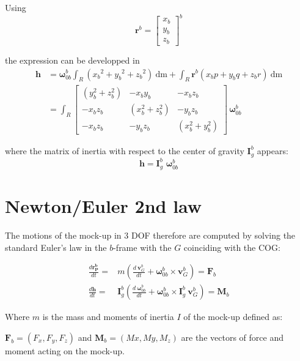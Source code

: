 \documentclass{article}
\begin{document}
Using 
\begin{equation}
	\textbf{r}^b=
  \begin{bmatrix}
	x_{b} \\
	y_{b} \\
	z_{b}
	\end{bmatrix}^b
\end{equation}

the expression can be developped in
\begin{align} \label{angularmomentumtoInertia}
\textbf{h} & =    \mathbf{\omega}_{0b}^b \int_{R} ({x_{b}}^2 + {y_{b}}^2 + {z_{b}}^2 ) \: \text{dm}  + \int_{R} \textbf{r}^b ({x_{b}} p + {y_{b}} q + {z_{b}} r)  \: \text{dm} \\
& = \int_{R}
\begin{bmatrix}
(y_b^2 + z_b^2)  &  - x_b y_b & - x_b z_b \\
 - x_b z_b & (x_b^2 + z_b^2) & -y_b z_b\\
 - x_b z_b &  -y_b z_b & (x_b^2 +y_b^2)
\end{bmatrix}\,  \mathbf{\omega}_{0b}^b
\end{align}

where the matrix of inertia with respect to the center of gravity $\textbf{I}^b_g$ appears:
\begin{equation}
 \textbf{h}=   \textbf{I}^b_g \, \,  \mathbf{\omega}_{0b}^b
\end{equation}


\section{Newton/Euler 2nd law}

The motions of the mock-up in 3 DOF therefore are computed by solving the standard Euler's law in the $b$-frame with the $G$ coinciding with the COG:  

\begin{align}
	\frac{d \mathbf{r^b_P}}{dt} =  & m(\frac{d \: \textbf{v}_{G}^b}{dt} + \mathbf{\omega}_{0b}^b \times \textbf{v}_{G}^b) = \textbf{F}_b \\
	\frac{d \textbf{h}}{dt} = & \textbf{I}^b_g(\frac{d \: \mathbf{\omega}_{0b}^b }{dt} + \mathbf{\omega}_{0b}^b \times \textbf{I}^b_g \: \textbf{v}_{G}^b) = \textbf{M}_b
\end{align}

Where $m$ is the mass and moments of inertia $I$ of the mock-up defined as:


 $\textbf{F}_b = (F_x, F_y, F_z)$ and  $\textbf{M}_b = (Mx, My, M_z)$ are the vectors of force and moment acting on the mock-up. 
\end{document}
